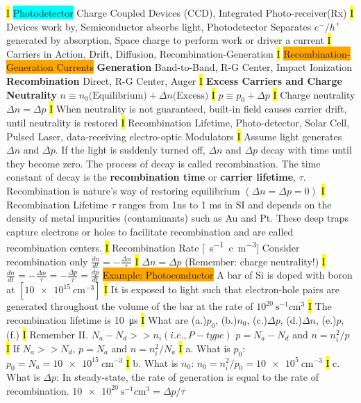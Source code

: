 \documentclass[fontsize=3]{scrartcl}
\begin{document}
\hl{I}
\colorbox{Cyan}{Photodetector}
Charge Coupled Devices (CCD), Integrated Photo-receiver(Rx)
\hl{I}
Devices work by, Semiconductor absorbs light, Photodetector Separates $e^{-}/h^{+}$ generated by absorption, Space charge to perform work or driver a current
\hl{I}
Carriers in Action, Drift, Diffusion, Recombination-Generation
\hl{I}
\colorbox{Orange}{Recombination-Generation Currents} 
\textbf{Generation} Band-to-Band, R-G Center, Impact Ionization
\textbf{Recombination} Direct, R-G Center, Auger
\hl{I}
\textbf{Excess Carriers and Charge Neutrality}
$n \equiv n_0 \text{(Equilibrium)} + \Delta n \text{(Excess)}$
\hl{I}
$p\equiv p_0 + \Delta p$
\hl{I}
Charge neutrality $\Delta n = \Delta p$
\hl{I}
When neutrality is not guaranteed, built-in field causes carrier drift, until neutrality is restored
\hl{I}
Recombination Lifetime, Photo-detector, Solar Cell, Pulsed Laser, data-receiving electro-optic Modulators
\hl{I}
Assume light generates $\Delta n$ and $\Delta p$. If the light is suddenly turned off, $\Delta n$ and $\Delta p$ decay with time until they become zero. The process of decay is called recombination. The time constant of decay is the \textbf{recombination time} or \textbf{carrier lifetime}, $\tau$. Recombination is nature's way of restoring equilibrium $(\Delta n = \Delta p = 0)$ 
\hl{I}
Recombination Lifetime $\tau$ ranges from 1ns to 1 ms in SI and depends on the density of metal impurities (contaminants) such as Au and Pt. These deep traps capture electrons or holes to facilitate recombination and are called recombination centers.
\hl{I} 
Recombination Rate [\SI{}{\second^{-1} c\meter^{-3}}] Consider recombination only $\frac{dn}{dt} = -\frac{\Delta n}{\tau}$
\hl{I}
$\Delta n = \Delta p$ (Remember: charge neutrality!)
\hl{I}
$\frac{dn}{dt} = -\frac{\Delta n}{\tau} = -\frac{\Delta p}{\tau} = \frac{dp}{dt}$
\colorbox{Orange}{Example: Photoconductor} 
A bar of Si is doped with boron at $[\SI{10e15}{c\meter^{-3}}]$
\hl{I}
It is exposed to light such that electron-hole pairs are generated throughout the volume of the bar at the rate of $ 10^{20} \SI{}{\second^{-1} c\meter^{3}}$
\hl{I}
The recombination lifetime is \SI{10}{\micro \second}
\hl{I}
What are (a.)$p_0$, (b.)$n_0$, (c.)$\Delta p$, (d.)$\Delta n$, (e.)$p$, (f.)
\hl{I}
Remember II. $N_a - N_d >> n_i (i.e., P-type)$ $p = N_a - N_d$ and $n = n_i^2 / p$
\hl{I}
If $N_a >> N_d$, $p = N_a$ and $n = n_i^2 / N_a$
\hl{I}
a. What is $p_0$: $p_0 = N_a = \SI{10e15}{c\meter^{-3}}$
\hl{I}
b. What is $n_0$: $n_0 = n_i^2 /p_0 = \SI{10e5}{c\meter^{-3}}$
\hl{I}
c. What is $\Delta p$: In steady-state, the rate of generation is equal to the rate of recombination. $\SI{10e20}{ \second^{-1} c\meter^{3} } = \Delta p / \tau $
\end{document}
